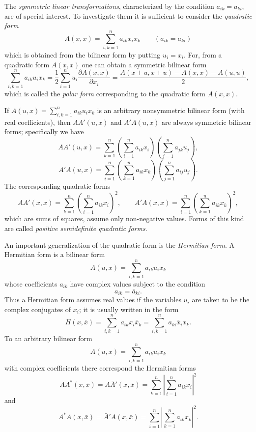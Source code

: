 The \emph{symmetric linear transformations}, characterized by the condition $a_{ik}=a_{ki}$, are of special interest. To investigate them it is sufficient to consider the \emph{quadratic form}
\[
A(x,x)=\sum_{i,k=1}^{n}a_{ik}x_i x_k\qquad(a_{ik}=a_{ki})
\]
which is obtained from the bilinear form by putting $u_i=x_i$. For, from a quadratic form $A(x,x)$ one can obtain a symmetric bilinear form
\[
\sum_{i,k=1}^{n}a_{ik}u_i x_k
=\frac12\sum_{i=1}^{n}u_i\frac{\partial A(x,x)}{\partial x_i}
=\frac{A(x+u,x+u)-A(x,x)-A(u,u)}{2},
\]
which is called the \emph{polar form} corresponding to the quadratic form $A(x,x)$.

If $A(u,x)=\sum_{i,k=1}^{n}a_{ik}u_i x_k$ is an arbitrary nonsymmetric bilinear form (with real coefficients), then $AA'(u,x)$ and $A'A(u,x)$ are always symmetric bilinear forms; specifically we have
\[
AA'(u,x)=\sum_{k=1}^{n}\left(\sum_{i=1}^{n}a_{ik}x_i\right)
\left(\sum_{j=1}^{n}a_{jk}u_j\right),
\]
\[
A'A(u,x)=\sum_{i=1}^{n}\left(\sum_{k=1}^{n}a_{ik}x_k\right)
\left(\sum_{j=1}^{n}a_{ij}u_j\right).
\]
The corresponding quadratic forms
\[
AA'(x,x)=\sum_{k=1}^{n}\left(\sum_{i=1}^{n}a_{ik}x_i\right)^2,
\qquad
A'A(x,x)=\sum_{i=1}^{n}\left(\sum_{k=1}^{n}a_{ik}x_k\right)^2,
\]
which are sums of squares, assume only non-negative values. Forms of this kind are called \emph{positive semidefinite quadratic forms}.

An important generalization of the quadratic form is the \emph{Hermitian form}. A Hermitian form is a bilinear form
\[
A(u,x)=\sum_{i,k=1}^{n}a_{ik}u_i x_k
\]
whose coefficients $a_{ik}$ have complex values subject to the condition
\[
a_{ik}=\bar a_{ki}.
\]
Thus a Hermitian form assumes real values if the variables $u_i$ are taken to be the complex conjugates of $x_i$; it is usually written in the form
\[
H(x,\bar x)=\sum_{i,k=1}^{n}a_{ik}x_i\bar x_k
=\sum_{i,k=1}^{n}a_{ki}\bar x_i x_k.
\]
To an arbitrary bilinear form
\[
A(u,x)=\sum_{i,k=1}^{n}a_{ik}u_i x_k
\]
with complex coefficients there correspond the Hermitian forms
\[
AA^*(x,\bar x)=A\bar A'(x,\bar x)
=\sum_{k=1}^{n}\left|\sum_{i=1}^{n}a_{ik}x_i\right|^2
\]
and
\[
A^*A(x,\bar x)=\bar A'A(x,\bar x)
=\sum_{i=1}^{n}\left|\sum_{k=1}^{n}a_{ik}x_k\right|^2.
\]

